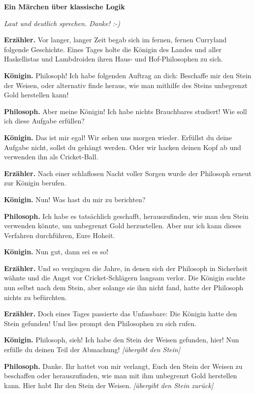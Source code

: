 \documentclass[16pt]{scrartcl}
\begin{document}
\begin{center}
{\large \textbf{Ein Märchen über klassische Logik}}

\emph{Laut und deutlich sprechen. Danke! :-)}
\end{center}

\textbf{Erzähler.}
Vor langer, langer Zeit begab sich im fernen, fernen Curry\-land folgende
Geschichte. Eines Tages holte die Königin des Landes und aller Haskellistas und
Lambdroiden ihren Haus- und Hof-Phi\-lo\-so\-phen zu sich.

\textbf{Königin.}
Philosoph! Ich habe folgenden Auftrag an dich: Beschaffe mir den Stein der
Weisen, oder alternativ finde heraus, wie man mithilfe des Steins unbegrenzt
Gold herstellen kann!

\textbf{Philosoph.}
Aber meine Königin! Ich habe nichts Brauchbares studiert! Wie soll ich diese
Aufgabe erfüllen?

\textbf{Königin.}
Das ist mir egal! Wir sehen uns morgen wieder. Erfüllst du deine Aufgabe nicht,
sollst du gehängt werden. Oder wir hacken deinen Kopf ab und verwenden ihn als
Cricket-Ball.

\textbf{Erzähler.}
Nach einer schlaflosen Nacht voller Sorgen wurde der Philosoph erneut zur
Königin berufen.

\textbf{Königin.}
Nun! Was hast du mir zu berichten?

\textbf{Philosoph.}
Ich habe es tatsächlich geschafft, herauszufinden, wie man den Stein verwenden
könnte, um unbegrenzt Gold herzustellen. Aber nur ich kann dieses Verfahren
durchführen, Eure Hoheit.

\textbf{Königin.}
Nun gut, dann sei es so!

\textbf{Erzähler.}
Und so vergingen die Jahre, in denen sich der Philosoph in Sicherheit wähnte
und die Angst vor Cricket-Schlägern langsam verlor. Die Königin suchte nun
selbst nach dem Stein, aber solange sie ihn nicht fand, hatte der Philosoph
nichts zu befürchten.

\textbf{Erzähler.}
Doch eines Tages passierte das Unfassbare: Die Königin hatte den Stein
gefunden! Und lies prompt den Philosophen zu sich rufen.

\textbf{Königin.}
Philosoph, sieh! Ich habe den Stein der Weisen gefunden, hier! Nun erfülle du
deinen Teil der Abmachung! \emph{[übergibt den Stein]}

\textbf{Philosoph.}
Danke. Ihr hattet von mir verlangt, Euch den Stein der Weisen zu beschaffen
oder herauszufinden, wie man mit ihm unbegrenzt Gold herstellen kann. Hier habt
Ihr den Stein der Weisen. \emph{[übergibt den Stein zurück]}
\end{document}
